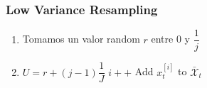 \begin{frame}
    \frametitle{Low Variance Resampling}

    \begin{center}
    \end{center}

    \begin{enumerate}
        \item<1-> Tomamos un valor random $r$ entre 0 y $\dfrac{1}{j}$
        \item<2>
        \begin{algorithmic}[1]
                \State $U = r + (j - 1)  \dfrac{1}{J}$
                    \State $i++$
                \EndWhile
                \State Add $x_t^{[i]}$ to $\bar{\mathcal{X}}_t$
            \EndFor
        \end{algorithmic}
    \end{enumerate}
    
\end{frame}

